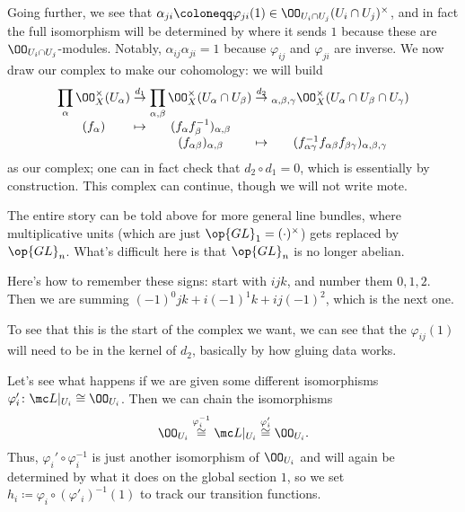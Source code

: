 \documentclass[../notes.tex]{subfiles}
\begin{document}
Going further, we see that $\alpha_{ji}\coloneqq\varphi_{ji}(1)\in\OO_{U_i\cap U_j}(U_i\cap U_j)^\times$, and in fact the full isomorphism will be determined by where it sends $1$ because these are $\OO_{U_i\cap U_j}$-modules. Notably, $\alpha_{ij}\alpha_{ji}=1$ because $\varphi_{ij}$ and $\varphi_{ji}$ are inverse. We now draw our complex to make our cohomology: we will build
\begin{equation}
	\arraycolsep=1.4pt\begin{array}{ccccccccc}
		\displaystyle\prod_{\alpha}\OO_X^\times(U_\alpha) &\stackrel{d_1}\to& \displaystyle\prod_{\alpha,\beta}\OO_X^\times(U_\alpha\cap U_\beta) &\stackrel{d_2}\to& \displaystyle_{\alpha,\beta,\gamma}\OO_X^\times(U_\alpha\cap U_\beta\cap U_\gamma) \\
		(f_\alpha) &\mapsto& (f_\alpha f_\beta^{-1})_{\alpha,\beta} \\
		&& (f_{\alpha\beta})_{\alpha,\beta} &\mapsto& (f_{\alpha\gamma}^{-1}f_{\alpha\beta}f_{\beta\gamma})_{\alpha,\beta,\gamma}
	\end{array} \label{eq:cech-complex-dim-1}
\end{equation}
as our complex; one can in fact check that $d_2\circ d_1=0$, which is essentially by construction. This complex can continue, though we will not write mote.
\begin{remark}
	The entire story can be told above for more general line bundles, where multiplicative units (which are just $\op{GL}_1=(\cdot)^\times$) gets replaced by $\op{GL}_n$. What's difficult here is that $\op{GL}_n$ is no longer abelian.
\end{remark}
\begin{remark}
	Here's how to remember these signs: start with $ijk$, and number them $0,1,2$. Then we are summing $(-1)^0jk+i(-1)^1k+ij(-1)^2$, which is the next one.
\end{remark}
\begin{remark}
	To see that this is the start of the complex we want, we can see that the $\varphi_{ij}(1)$ will need to be in the kernel of $d_2$, basically by how gluing data works.
\end{remark}
Let's see what happens if we are given some different isomorphisms $\varphi'_i\colon\mc L|_{U_i}\cong\OO_{U_i}$. Then we can chain the isomorphisms
\[\OO_{U_i}\stackrel{\varphi_i^{-1}}\cong\mc L|_{U_i}\stackrel{\varphi_i'}\cong\OO_{U_i}.\]
Thus, $\varphi_i'\circ\varphi_i^{-1}$ is just another isomorphism of $\OO_{U_i}$ and will again be determined by what it does on the global section $1$, so we set $h_i\coloneqq\varphi_i\circ(\varphi'_i)^{-1}(1)$ to track our transition functions.
\end{document}
